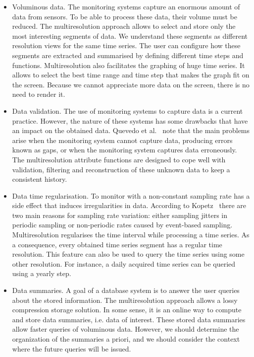 \begin{itemize}

\item Voluminous data. The monitoring systems capture an enormous
  amount of data from sensors. To be able to process these data, their
  volume must be reduced. The multiresolution approach allows to
  select and store only the most interesting segments of data. We
  understand these segments as different resolution views for the same
  time series. The user can configure how these segments are extracted
  and summarised by defining different time steps and
  functions. Multiresolution also facilitates the graphing of huge
  time series. It allows to select the best time range and time step
  that makes the graph fit on the screen. Because we cannot appreciate
  more data on the screen, there is no need to render it.

\item Data validation. The use of monitoring systems to capture data
  is a current practice. However, the nature of these systems has some
  drawbacks that have an impact on the obtained data. Quevedo et
  al.~\cite{quevedo10} note that the main problems arise when the
  monitoring system cannot capture data, producing errors known as
  gaps, or when the monitoring system captures data erroneously.  The
  multiresolution attribute functions are designed to cope well with
  validation, filtering and reconstruction of these unknown data to
  keep a consistent history.

\item Data time regularisation. To monitor with a non-constant
  sampling rate has a side effect that induces irregularities in
  data. According to Kopetz~\cite{kopetz11:realtime} there are two
  main reasons for sampling rate variation: either sampling jitters in
  periodic sampling or non-periodic rates caused by event-based
  sampling.  Multiresolution regularises the time interval while
  processing a time series. As a consequence, every obtained time
  series segment has a regular time resolution. This feature can also
  be used to query the time series using some other resolution. For
  instance, a daily acquired time series can be queried using a yearly
  step.

\item Data summaries. A goal of a database system is to answer the
  user queries about the stored information. The multiresolution
  approach allows a lossy compression storage solution. In some sense,
  it is an online way to compute and store data summaries, i.e. data
  of interest. These stored data summaries allow faster queries of
  voluminous data. However, we should determine the organization of
  the summaries a priori, and we should consider the context where the
  future queries will be issued.

\end{itemize}



